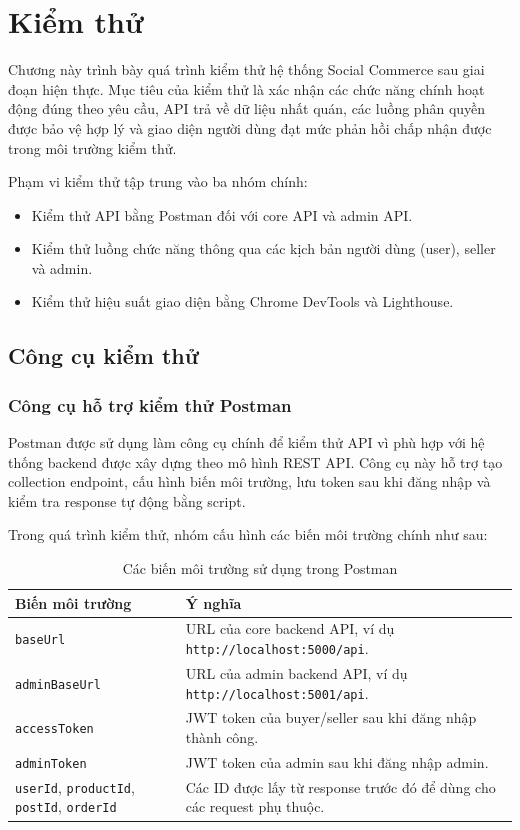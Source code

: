 \chapter{Kiểm thử}

Chương này trình bày quá trình kiểm thử hệ thống Social Commerce sau giai đoạn hiện thực. Mục tiêu của kiểm thử là xác nhận các chức năng chính hoạt động đúng theo yêu cầu, API trả về dữ liệu nhất quán, các luồng phân quyền được bảo vệ hợp lý và giao diện người dùng đạt mức phản hồi chấp nhận được trong môi trường kiểm thử.

Phạm vi kiểm thử tập trung vào ba nhóm chính:

\begin{itemize}
    \item Kiểm thử API bằng Postman đối với core API và admin API.
    \item Kiểm thử luồng chức năng thông qua các kịch bản người dùng (user), seller và admin.
    \item Kiểm thử hiệu suất giao diện bằng Chrome DevTools và Lighthouse.
\end{itemize}

\section{Công cụ kiểm thử}

\subsection{Công cụ hỗ trợ kiểm thử Postman}

Postman được sử dụng làm công cụ chính để kiểm thử API vì phù hợp với hệ thống backend được xây dựng theo mô hình REST API. Công cụ này hỗ trợ tạo collection endpoint, cấu hình biến môi trường, lưu token sau khi đăng nhập và kiểm tra response tự động bằng script.

Trong quá trình kiểm thử, nhóm cấu hình các biến môi trường chính như sau:

\begin{table}[H]
\centering
\caption{Các biến môi trường sử dụng trong Postman}
\begin{tabularx}{\textwidth}{|p{}|X|}
\hline
\textbf{Biến môi trường} & \textbf{Ý nghĩa} \\ \hline
\texttt{baseUrl} & URL của core backend API, ví dụ \texttt{http://localhost:5000/api}. \\ \hline
\texttt{adminBaseUrl} & URL của admin backend API, ví dụ \texttt{http://localhost:5001/api}. \\ \hline
\texttt{accessToken} & JWT token của buyer/seller sau khi đăng nhập thành công. \\ \hline
\texttt{adminToken} & JWT token của admin sau khi đăng nhập admin. \\ \hline
\texttt{userId}, \texttt{productId}, \texttt{postId}, \texttt{orderId} & Các ID được lấy từ response trước đó để dùng cho các request phụ thuộc. \\ \hline
\end{tabularx}
\end{table}

